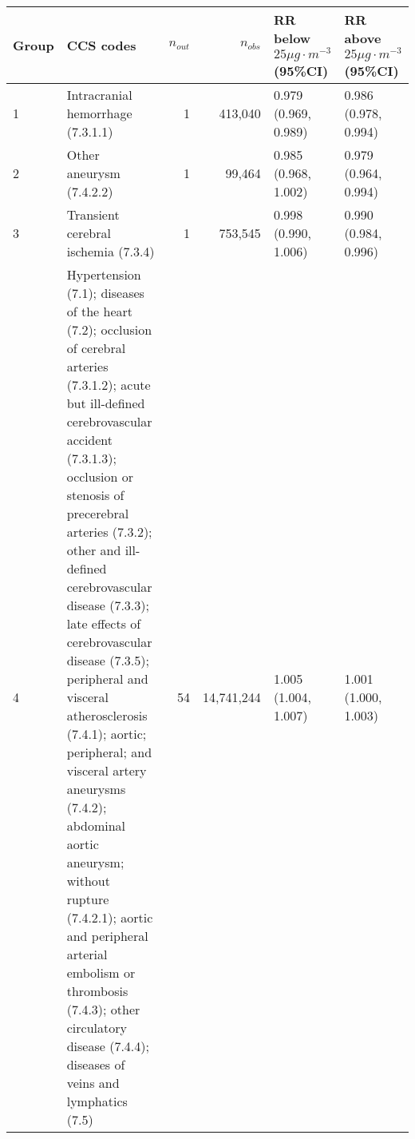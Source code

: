 \begin{tabular}{lp{6.5cm}rrp{2.2cm}p{2.2cm}}
  \hline
Group & CCS codes & $n_{out}$ & $n_{obs}$ & RR below $25 \mu g \cdot m^{-3}$ (95\%CI) & RR above $25 \mu g \cdot m^{-3}$ (95\%CI) \\ 
  \hline
   1 & Intracranial hemorrhage (7.3.1.1) &    1 & 413,040 & 0.979 (0.969, 0.989) & 0.986 (0.978, 0.994) \\ 
     2 & Other aneurysm (7.4.2.2) &    1 & 99,464 & 0.985 (0.968, 1.002) & 0.979 (0.964, 0.994) \\ 
     3 & Transient cerebral ischemia (7.3.4) &    1 & 753,545 & 0.998 (0.990, 1.006) & 0.990 (0.984, 0.996) \\ 
     4 & Hypertension (7.1); diseases of the heart (7.2); occlusion of cerebral arteries (7.3.1.2); acute but ill-defined cerebrovascular accident (7.3.1.3); occlusion or stenosis of precerebral arteries (7.3.2); other and ill-defined cerebrovascular disease (7.3.3); late effects of cerebrovascular disease (7.3.5); peripheral and visceral atherosclerosis (7.4.1); aortic; peripheral; and visceral artery aneurysms (7.4.2); abdominal aortic aneurysm; without rupture (7.4.2.1); aortic and peripheral arterial embolism or thrombosis (7.4.3); other circulatory disease (7.4.4); diseases of veins and lymphatics (7.5) &   54 & 14,741,244 & 1.005 (1.004, 1.007) & 1.001 (1.000, 1.003) \\ 
   \hline
\end{tabular}

